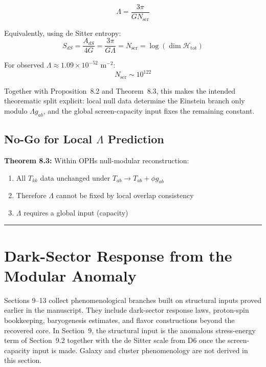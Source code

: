 \[\Lambda = \frac{3\pi}{G N_{\mathrm{scr}}}\]

Equivalently, using de Sitter entropy: \[S_{dS} = \frac{A_{dS}}{4G} = \frac{3\pi}{G\Lambda} = N_{\mathrm{scr}} = \log(\dim \mathcal{H}_{\text{tot}})\]

For observed \(\Lambda \approx 1.09 \times 10^{-52}\) m\(^{-2}\): \[N_{\mathrm{scr}} \sim 10^{122}\]

Together with Proposition~8.2 and Theorem~8.3, this makes the intended theorematic split explicit: local null data determine the Einstein branch only modulo \(\Lambda g_{ab}\), and the global screen-capacity input fixes the remaining constant.

\subsection{\texorpdfstring{No-Go for Local \(\Lambda\) Prediction}{No-Go for Local Lambda Prediction}}\label{84-no-go-for-local-ux3bb-prediction}

\textbf{Theorem 8.3:} Within OPH\textquotesingle s null-modular reconstruction:

\begin{enumerate}
\def\labelenumi{\arabic{enumi}.}
\tightlist
\item
 All \(T_{kk}\) data unchanged under \(T_{ab} \to T_{ab} + \phi g_{ab}\)
\item
 Therefore \(\Lambda\) cannot be fixed by local overlap consistency
\item
 \(\Lambda\) requires a global input (capacity)
\end{enumerate}

\begin{center}\rule{0.5\linewidth}{0.5pt}\end{center}

\section{Dark-Sector Response from the Modular Anomaly}\label{9-dark-matter-as-modular-anomaly}

Sections 9--13 collect phenomenological branches built on structural inputs proved earlier in the manuscript. They include dark-sector response laws, proton-spin bookkeeping, baryogenesis estimates, and flavor constructions beyond the recovered core. In Section~9, the structural input is the anomalous stress-energy term of Section~9.2 together with the de Sitter scale from D6 once the screen-capacity input is made. Galaxy and cluster phenomenology are not derived in this section.

